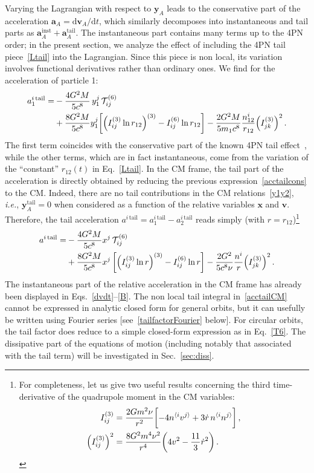 \documentclass[prd,preprint,superscriptaddress,tightenlines,nofootinbib,
  eqsecnum,showpacs]{revtex4}
\newcommand{\ud}{\mathrm{d}}
\begin{document}
Varying the Lagrangian with respect to $\bm{y}_A$ leads to the conservative
part of the acceleration $\bm{a}_A=\ud \bm{v}_A/\ud t$, which similarly decomposes
into instantaneous and tail parts as
$\bm{a}_A^\text{inst} + \bm{a}_A^\text{tail}$. The instantaneous part contains
many terms up to the 4PN order; in the present section, we analyze the effect of
including the 4PN tail piece~\eqref{Ltail} into the Lagrangian. Since this piece is non
local, its variation involves functional derivatives rather than ordinary ones.
We find for the acceleration of particle 1:
%
\begin{align}\label{acctailcons}
a_1^{i\,\text{tail}} =& -\frac{4G^2M}{5c^8} \,y_1^j
  \,\mathcal{T}_{ij}^{(6)}\nonumber\\ & +\frac{8G^2M}{5c^8}
  y_1^j\biggl[\left(I_{ij}^{(3)}\ln r_{12}\right)^{(3)}-I_{ij}^{(6)}\ln
    r_{12}\biggr] -\frac{2G^2M}{5m_1c^8}
  \frac{n_{12}^i}{r_{12}}\Bigl(I_{jk}^{(3)}\Bigr)^2\,.
\end{align}
%
The first term coincides with the conservative part of the known 4PN tail
effect~\cite{BD88, B93, B97}, while the other terms, which are in fact instantaneous,
come from the variation of the ``constant'' $r_{12}(t)$ in
Eq.~\eqref{Ltail}. In the CM frame, the tail part of the acceleration is
directly obtained by reducing the previous expression~\eqref{acctailcons} to
the CM. Indeed, there are no tail contributions in the CM
relations~\eqref{y1y2}, \textit{i.e.}, $\bm{y}_A^\text{tail}=0$ when
considered as a function of the relative variables $\bm{x}$ and $\bm{v}$.
Therefore, the tail acceleration
$a^{i\,\text{tail}} = a_1^{i\,\text{tail}} - a_2^{i\,\text{tail}}$ reads simply
(with $r=r_{12}$)\footnote{For completeness, let us give two useful results
  concerning the third time-derivative of the quadrupole moment in
  the CM variables:
%
\begin{align*}
I_{ij}^{(3)} &= \frac{2G m^2\nu}{r^2}\biggl[-4 n^{\langle
    i}v^{j\rangle} + 3\dot{r}\,n^{\langle
    i}n^{j\rangle}\biggr]\,,\\ \Bigl(I_{ij}^{(3)}\Bigr)^2 &=
\frac{8G^2 m^4\nu^2}{r^4}\biggl(4 v^2 -
\frac{11}{3}\dot{r}^2\biggr)\,.
\end{align*}}
%
\begin{align}\label{acctailCM}
a^{i\,\text{tail}} =& -\frac{4G^2M}{5c^8}
  x^j\,\mathcal{T}_{ij}^{(6)}\nonumber\\ & +\frac{8G^2M}{5c^8}
  x^j\left[\left(I_{ij}^{(3)}\ln r\right)^{(3)}-I_{ij}^{(6)}\ln
    r\right] -\frac{2G^2}{5c^8\nu}
  \frac{n^i}{r}\Bigl(I_{jk}^{(3)}\Bigr)^2\,.
\end{align}
%
The instantaneous part of the relative acceleration in the CM frame has
already been
displayed in Eqs.~\eqref{dvdt}--\eqref{B}. The non local tail integral
in~\eqref{acctailCM} cannot be expressed in analytic closed form for general
orbits, but it can usefully be written using Fourier series
[see~\eqref{tailfactorFourier} below]. For circular orbits, the tail factor does
reduce to a simple closed-form expression as in Eq.~\eqref{T6}. The
dissipative part of the equations of motion (including notably that associated
with the tail term) will be investigated in Sec.~\ref{sec:diss}.
\end{document}
